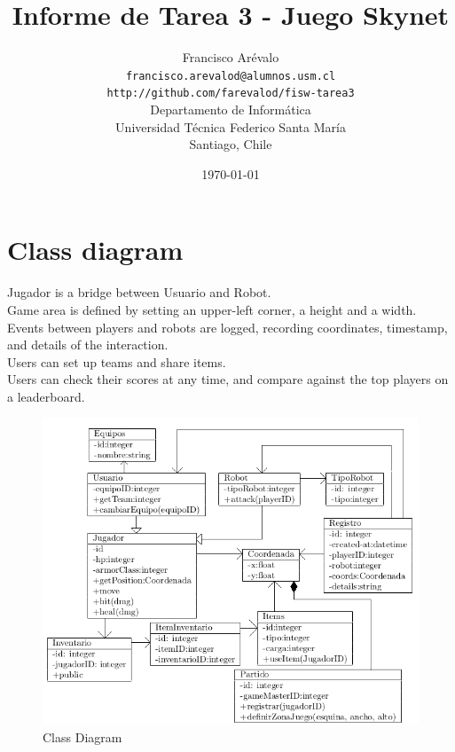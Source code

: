 \documentclass{article}
\begin{document}
\title{Informe de Tarea 3 - Juego Skynet}
\author{Francisco Ar\'evalo\\
  \texttt{francisco.arevalod@alumnos.usm.cl}\\
  \texttt{http://github.com/farevalod/fisw-tarea3}\\
  \vspace{10mm}
  Departamento de Inform\'atica\\
  Universidad T\'ecnica Federico Santa Mar\'ia\\
  Santiago, Chile}
\date{\today}
\maketitle
\tableofcontents
\section{Class diagram}
Jugador is a bridge between Usuario and Robot.\\
Game area is defined by setting an upper-left corner, a height and a width.\\
Events between players and robots are logged, recording coordinates, timestamp, and details of the interaction.\\
Users can set up teams and share items.\\
Users can check their scores at any time, and compare against the top players on a leaderboard.
\begin{figure}[htb]
\centering
\includegraphics[scale=0.5]{clases}
\caption{Class Diagram}
\end{figure}
\end{document}
